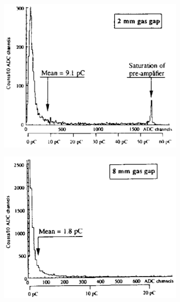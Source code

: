 	\begin{figure}[H]
		\hspace*{-0.05\plotwidth}
		\begin{subfigure}{0.5\linewidth}
			\centering
			\includegraphics[width = 0.5\plotwidth]{fig/chapt4/Fast-charge-2mm.png}
			\caption{\label{fig:GapWidthCharge:A}}
		\end{subfigure}
		\begin{subfigure}{0.5\linewidth}
			\centering
			\includegraphics[width = 0.5\plotwidth]{fig/chapt4/Fast-charge-8mm.png}
			\caption{\label{fig:GapWidthCharge:B}}

\end{subfigure}
\end{figure}
